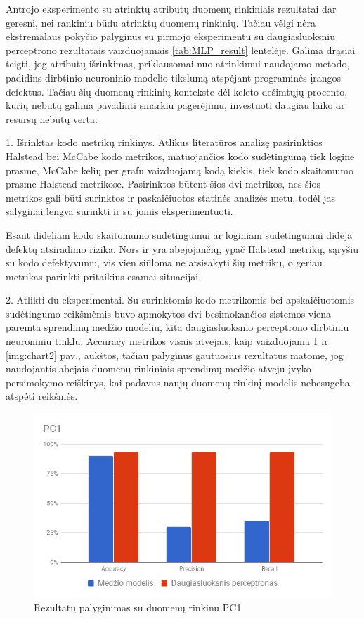 \documentclass{VUMIFPSbakalaurinis}
\begin{document}
Antrojo eksperimento su atrinktų atributų duomenų rinkiniais rezultatai dar geresni, nei rankiniu būdu atrinktų duomenų rinkinių. Tačiau vėlgi nėra ekstremalaus pokyčio palyginus su pirmojo eksperimentu su daugiasluoksniu perceptrono rezultatais vaizduojamais \ref{tab:MLP_result} lentelėje. Galima drąsiai teigti, jog atributų išrinkimas, priklausomai nuo atrinkimui naudojamo metodo, padidins dirbtinio neuroninio modelio tikslumą atspėjant programinės įrangos defektus. Tačiau šių duomenų rinkinių kontekste dėl keleto dešimtųjų procento, kurių nebūtų galima pavadinti smarkiu pagerėjimu, investuoti daugiau laiko ar resursų nebūtų verta.



1. Išrinktas kodo metrikų rinkinys. Atlikus literatūros analizę pasirinktios Halstead bei McCabe kodo metrikos, matuojančios kodo sudėtingumą tiek logine prasme, McCabe kelių per grafu vaizduojamą kodą kiekis, tiek kodo skaitomumo prasme Halstead metrikose. Pasirinktos būtent šios dvi metrikos, nes šios metrikos gali būti surinktos ir paskaičiuotos statinės analizės metu, todėl jas salyginai lengva surinkti ir su jomis eksperimentuoti.

Esant dideliam kodo skaitomumo sudėtingumui ar loginiam sudėtingumui didėja defektų atsiradimo rizika. Nors ir yra abejojančių, ypač Halstead metrikų, sąryšiu su kodo defektyvumu, vis vien siūloma ne atsisakyti šių metrikų, o geriau metrikas parinkti pritaikius esamai situacijai. 

2. Atlikti du eksperimentai. Su surinktomis kodo metrikomis bei apskaičiuotomis sudėtingumo reikšmėmis buvo apmokytos dvi besimokančios sistemos viena paremta sprendimų medžio modeliu, kita daugiasluoksnio perceptrono dirbtiniu neuroniniu tinklu. Accuracy metrikos visais atvejais, kaip vaizduojama \ref{img:chart} ir \ref{img:chart2} pav., aukštos, tačiau palyginus gautuosius rezultatus matome, jog naudojantis abejais duomenų rinkiniais sprendimų medžio atveju įvyko persimokymo reiškinys, kai padavus naujų duomenų rinkinį modelis nebesugeba atspėti reikšmės.

\begin{figure}[H]
    \centering
    \includegraphics[scale=0.5]{img/chart}
    \caption{Rezultatų palyginimas su duomenų rinkinu PC1}
    \label{img:chart}
\end{figure}
\end{document}
